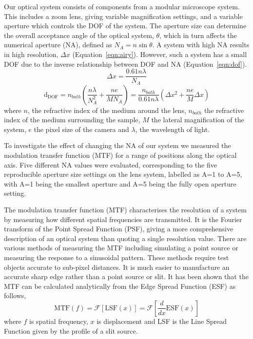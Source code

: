 Our optical system consists of components from a modular microscope system. This includes a zoom lens, giving variable magnification settings, and a variable aperture which controls the DOF of the system. 
The aperture size can determine the overall acceptance angle of the optical system, $\theta$, which in turn affects the numerical aperture (NA), defined as $N_A = n \sin{\theta}$.  A system with high NA results in high resolution, $\Delta x$ (Equation~\ref{eqn:airy}). However, such a system has a small DOF due to the inverse relationship between DOF and NA (Equation~\ref{eqn:dof}).
\begin{equation}
\Delta x =  \frac{0.61 n\lambda}{N_A}
\label{eqn:airy}
\end{equation}
\begin{equation}
\mathrm{d_{DOF}} = n_{bath}\left( \frac{n\lambda}{N_{A}^2}+\frac{ne}{MN_{A}} \right) = \frac{n_{bath}}{0.61n\lambda}\left( \Delta x^2 + \frac{n e}{M}\Delta x \right)
\label{eqn:dof}
\end{equation}
where $n$, the refractive index of the medium around the lens, $n_{bath}$ the refractive index of the medium surrounding the sample, $M$ the lateral magnification of the system, $e$ the pixel size of the camera and $\lambda$, the wavelength of light.





To investigate the effect of changing the NA of our system we measured the modulation transfer function (MTF) for a range of positions along the optical axis. Five different NA values were evaluated, corresponding to the five reproducible aperture size settings on the lens system, labelled as A=1 to A=5, with A=1 being the smallest aperture and A=5 being the fully open aperture setting. 

The modulation transfer function (MTF) characterises the resolution of a system by measuring how different spatial frequencies are transmitted.
It is the Fourier transform of the Point Spread Function (PSF), giving a more comprehensive description of an optical system than quoting a single  resolution value. There are various methods of measuring the MTF including simulating a point source or measuring the response to a sinusoidal pattern. These methods require test objects accurate to sub-pixel distances. 
It is much easier to manufacture an accurate  sharp edge rather than  a point source or slit. It has been shown that the MTF can be calculated analytically from the Edge Spread Function (ESF) as follows,
\begin{equation}
\mathrm{MTF}(f) = \mathscr{F}\left[\mathrm{LSF}(x)\right] = \mathscr{F}\left[\frac{d}{dx}\mathrm{ESF}(x)\right]
\end{equation}
where $f$ is spatial frequency, $x$ is displacement and LSF is the Line Spread Function given by the profile of a slit source. \cite{Boone:1986}

